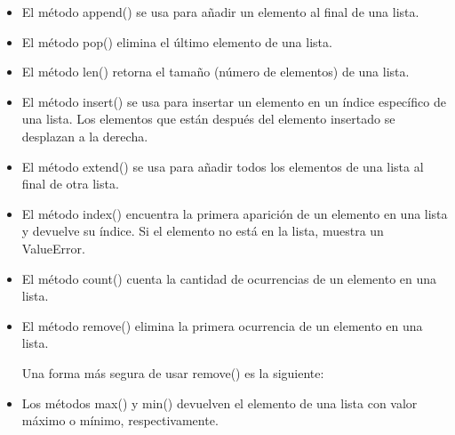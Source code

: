 \documentclass{report}
\begin{document}
\begin{itemize}
  \item El método append() se usa para añadir un elemento al final de una lista.
  

  \item El método pop() elimina el último elemento de una lista.
  

  \item El método len() retorna el tamaño (número de elementos) de una lista.
  

  \item El método insert() se usa para insertar un elemento en un índice específico de una lista. Los elementos que están después del elemento insertado se desplazan a la derecha.


  \item El método extend() se usa para añadir todos los elementos de una lista al final de otra lista.
  

  \item El método index() encuentra la primera aparición de un elemento en una lista y devuelve su índice. Si el elemento no está en la lista, muestra un ValueError.
  

  \item El método count() cuenta la cantidad de ocurrencias de un elemento en una lista.
  

  \item El método remove() elimina la primera ocurrencia de un elemento en una lista.
  

  Una forma más segura de usar remove() es la siguiente:


  \item Los métodos max() y min() devuelven el elemento de una lista con valor máximo o mínimo, respectivamente.


\end{itemize}
\end{document}
